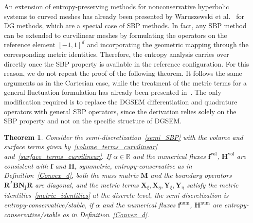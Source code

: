 \documentclass[]{scrartcl}
\newcommand{\mtx}[1]{\boldsymbol{#1}}
\renewcommand{\vec}[1]{\boldsymbol{#1}}
\newtheorem{theorem}{Theorem}[section]
\theoremstyle{definition}
\begin{document}
An extension of entropy-preserving methods for nonconservative hyperbolic systems to curved meshes has already been presented by Waruszewski et al.~\cite{WARUSZEWSKI2022111507} for DG methods, which are a special case of SBP methods.
In fact, any SBP method can be extended to curvilinear meshes by formulating the operators on the reference element $[-1,1]^d$ and incorporating the geometric mapping through the corresponding metric identities.
Therefore, the entropy analysis carries over directly once the SBP property is available in the reference configuration.
For this reason, we do not repeat the proof of the following theorem.
It follows the same arguments as in the Cartesian case, while the treatment of the metric terms for a general fluctuation formulation has already been presented in~\cite{WARUSZEWSKI2022111507}.
The only modification required is to replace the DGSEM differentiation and quadrature operators with general SBP operators, since the derivation relies solely on the SBP property and not on the specific structure of DGSEM.
\begin{theorem}
    Consider the semi-discretization~\eqref{semi_SBP} with the volume and surface terms given by~\eqref{volume_terms_curvilinear} and~\eqref{surface_terms_curvilinear}.
    If $\alpha \in \mathbb{R}$ and the numerical fluxes $\vec{f}^{\mathrm{vol}}$, $\vec{H}^{\mathrm{vol}}$ are consistent with $\vec{f}$ and $\vec{H}$, symmetric, entropy-conservative as in Definition~\ref{Convex_d}, both the mass matrix $\mtx{M}$ and the boundary operators $\mtx{R}^T \mtx{B} \mtx{N_j} \mtx{R}$ are diagonal, and the metric terms $\vec{X}_\xi, \vec{X}_\eta, \vec{Y}_\xi, \vec{Y}_\eta$ satisfy the metric identities~\eqref{metric_identities} at the discrete level, the semi-discretization is entropy-conservative/stable, if $\alpha$ and the numerical fluxes $\vec{f}^{\mathrm{num}}$, $\vec{H}^{\mathrm{num}}$ are entropy-conservative/stable as in Definition~\ref{Convex_d}.
\end{theorem}
\end{document}
